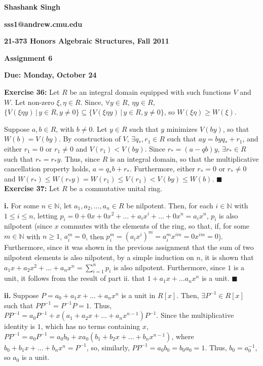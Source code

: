 \documentclass{article}%
\begin{document}
\begin{center}
\textbf{Shashank Singh}

\textbf{sss1@andrew.cmu.edu}

\textbf{21-373 \quad Honors Algebraic Structures, Fall 2011}

\textbf{Assignment 6}

\textbf{Due: Monday, October 24}\\
\end{center}

\textbf{Exercise 36:} Let $R$ be an integral domain equipped with such
functions $V$ and $W$. Let non-zero $\xi, \eta \in R$. Since, $\forall y \in
R$, $\eta y \in R$, $\{V(\xi \eta y) \, | \, y \in R, y \neq 0\} \subseteq
\{V(\xi \eta y) \, | \, y \in R, y \neq 0\}$, so $W(\xi \eta) \geq W(\xi)$.

Suppose $a, b \in R$, with $b \neq 0$. Let $y \in R$ such that $y$ minimizes
$V(by)$, so that $W(b) = V(by)$. By construction of $V$, $\exists q_*, r_1 \in
R$ such that $ay = byq_* + r_1$, and either $r_1 = 0$ or $r_1 \neq 0$ and
$V(r_1) < V(by)$. Since $r_* = (a - qb)y$, $\exists r_* \in R$ such that
$r_* = r_*y$. Thus, since $R$ is an integral domain, so that the multiplicative
cancellation property holds, $a = q_*b + r_*$. Furthermore, either $r_* = 0$ or
$r_* \neq 0$ and $W(r_*) \leq W(r_*y) = W(r_1) \leq V(r_1) < V(by) \leq W(b)$.
\qquad $\blacksquare$ \\


\textbf{Exercise 37:} Let $R$ be a commutative unital ring.

\textbf{i.} For some $n \in \mathbb{N}$, let $a_1, a_2, \ldots, a_n \in R$ be
nilpotent. Then, for each $i \in \mathbb{N}$ with $1 \leq i \leq n$,
letting $p_i = 0 + 0x + 0x^2 + \ldots + a_ix^i + \ldots + 0x^n = a_ix^n$,
$p_i$ is also nilpotent (since $x$ commutes with the elements of the ring, so
that, if, for some $m \in \mathbb{N}$ with $n \geq 1$, $a_i^m = 0$, then
$p_i^m = \left(a_ix^i\right)^m = a_i^m x^{im} = 0 x^{im} = 0$). Furthermore,
since it was shown in the previous assignment that the sum of two nilpotent
elements is also nilpotent, by a simple induction on $n$, it is shown that
$a_1x + a_2x^2 + \ldots + a_nx^n = \sum_{i = 1}^n p_i$ is also nilpotent.
Furthermore, since $1$ is a unit, it follows from the result of part ii. that
$1 + a_1x + \ldots a_nx^n$ is a unit. \qquad $\blacksquare$

\textbf{ii.} Suppose $P = a_0 + a_1x + \ldots + a_nx^n$ is a unit in $R[x]$.
Then, $\exists P^{-1} \in R[x]$ such that $PP^{-1} = P^{-1}P = 1$. Thus,
$PP^{-1} = a_0P^{-1} + x(a_1 + a_2x + \ldots + a_nx^{n - 1})P^{-1}$. Since the
multiplicative identity is $1$, which has no terms containing $x$, $PP^{-1}
 = a_0P^{-1} = a_0b_0 + xa_0(b_1 + b_2x + \ldots + b_nx^{n - 1})$, where
$b_0 + b_1x + \ldots + b_nx^n = P^{-1}$, so, similarly, $PP^{-1} = a_0b_0 =
b_0a_0 = 1$. Thus, $b_0 = a_0^{-1}$, so $a_0$ is a unit.
\end{document}
